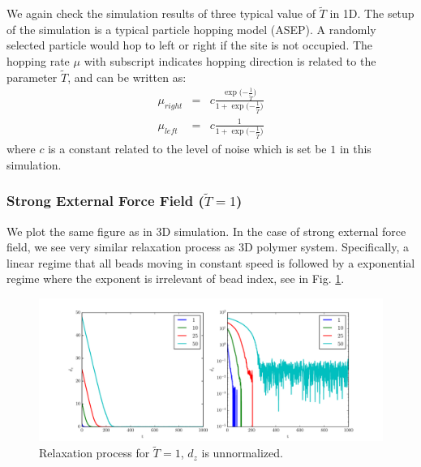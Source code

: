 \documentclass[12pt,a4paper]{article}
\begin{document}
We again check the simulation results of three typical value of $\tilde{T}$ in
1D. The setup of the simulation is a typical particle hopping model (ASEP). A
randomly selected particle would hop to left or right if the site is not
occupied. The hopping rate $\mu$ with subscript indicates hopping direction is
related to the parameter $\tilde{T}$, and can be written as:
\begin{eqnarray}
    \mu_{right} & = &
    c\frac{\exp{(-\frac{1}{\tilde{T}}})}{1+\exp{(-\frac{1}{\tilde{T}}})} \\
    \mu_{left} & = & c\frac{1}{1+\exp{(-\frac{1}{\tilde{T}}})}
\end{eqnarray}
where $c$ is a constant related to the level of noise which is set be $1$ in
this simulation.

\subsubsection{Strong External Force Field ($\tilde{T}=1$)}
We plot the same figure as in 3D simulation. In the case of strong external
force field, we see very similar relaxation process as 3D polymer system.
Specifically, a linear regime that all beads moving in constant speed is
followed by a exponential regime where the exponent is irrelevant of bead index,
see in Fig. \ref{fig:asept1}.
\begin{figure}[htpb]
    \centering
    \includegraphics[width=1.0\linewidth]{fig4report/asep_N100_T1_un.pdf}
    \caption{Relaxation process for $\tilde{T}=1$, $d_z$ is unnormalized.} 
    \label{fig:asept1}
\end{figure}
\end{document}
